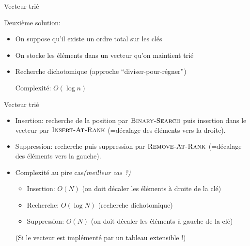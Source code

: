 \begin{frame}{Vecteur trié}

Deuxième solution:
\begin{itemize}
\item On suppose qu'il existe un ordre total sur les clés
\item On stocke les éléments dans un \alert{vecteur} qu'on maintient trié
\item Recherche dichotomique (approche ``diviser-pour-régner'')

\begin{center}
\begin{small}
\end{small}
\end{center}
Complexité: $O(\log n)$
\end{itemize}
\end{frame}

\begin{frame}{Vecteur trié}
\begin{itemize}
\item Insertion: recherche de la position par $\textnormal{\scshape Binary-Search}$ puis insertion dans le vecteur par $\textnormal{\scshape Insert-At-Rank}$ (=décalage des éléments vers la droite).
\item Suppression: recherche puis suppression par $\textnormal{\scshape Remove-At-Rank}$ (=décalage des éléments vers la gauche).
\item Complexité au pire cas\hfill{\it (meilleur cas ?)}
\begin{itemize}
\item Insertion: $O(N)$ (on doit décaler les éléments à droite de la clé)
\item Recherche: $O(\log N)$ (recherche dichotomique)
\item Suppression: $O(N)$ (on doit décaler les éléments à gauche de la clé)
\end{itemize}
(Si le vecteur est implémenté par un tableau extensible !)
\end{itemize}


\end{frame}

